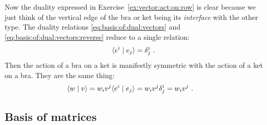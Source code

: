 \documentclass[12pt, oneside]{report}    %
\begin{document}
Now the duality expressed in Exercise~\ref{ex:vector:act:on:row} is clear because we just think of the vertical edge of the bra or ket being its \emph{interface} with the other type. The duality relations \eqref{eq:basis:of:dual:vectors} and \eqref{eq:basis:of:dual:vectors:reverse} reduce to a single relation:
\begin{align}
    \langle e^i \mid e_j \rangle = \delta^i_j \ .
    \label{eq:defining:bra:ket:relatin}
\end{align}
Then the action of a bra on a ket is manifestly symmetric with the action of a ket on a bra. They are the same thing:
\begin{align}
    \langle w \mid v \rangle &= w_iv^j \langle e^i \mid e_j \rangle  = w_i v^j \delta^i_j = w_iv^j \ .
    \label{eq:basis:of:dual:vectors:bra:ket:form}
\end{align}

\subsection{Basis of matrices}
\end{document}

